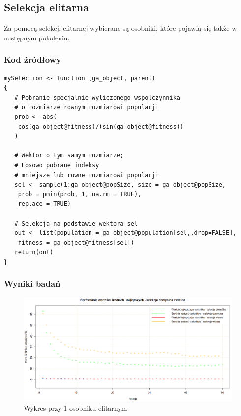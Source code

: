 \subsection{Selekcja elitarna}

Za pomocą selekcji elitarnej wybierane są osobniki, które pojawią się także w następnym pokoleniu. 

\subsubsection{Kod źródłowy}

\begin{lstlisting}[linewidth=16.0cm]
mySelection <- function (ga_object, parent)
{
   # Pobranie specjalnie wyliczonego wspolczynnika
   # o rozmiarze rownym rozmiarowi populacji
   prob <- abs(
   	cos(ga_object@fitness)/(sin(ga_object@fitness))
   )
	
   # Wektor o tym samym rozmiarze;
   # Losowo pobrane indeksy 
   # mniejsze lub rowne rozmiarowi populacji
   sel <- sample(1:ga_object@popSize, size = ga_object@popSize, 
   	prob = pmin(prob, 1, na.rm = TRUE),
   	replace = TRUE)

   # Selekcja na podstawie wektora sel
   out <- list(population = ga_object@population[sel,,drop=FALSE],
   	fitness = ga_object@fitness[sel])
   return(out)
}

\end{lstlisting}

\subsubsection{Wyniki badań}


\begin{figure}[H]
	\centering
	\hspace*{-0.8in}
	\includegraphics[scale = 0.47]{img/zad1/sel_1}
	\caption{Wykres przy 1 osobniku elitarnym}  
	\label{rys:sel_1} 
\end{figure}

